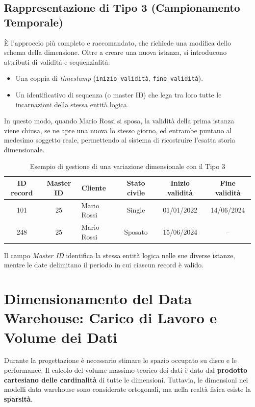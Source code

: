 \subsection{Rappresentazione di Tipo 3 (Campionamento Temporale)}
È l'approccio più completo e raccomandato, che richiede una modifica dello schema della dimensione. Oltre a creare una nuova istanza, si introducono attributi di validità e sequenzialità:
\begin{itemize}
    \item Una coppia di \textit{timestamp} (\texttt{inizio\_validità}, \texttt{fine\_validità}).
    \item Un identificativo di sequenza (o master ID) che lega tra loro tutte le incarnazioni della stessa entità logica.
\end{itemize}
In questo modo, quando Mario Rossi si sposa, la validità della prima istanza viene chiusa, se ne apre una nuova lo stesso giorno, ed entrambe puntano al medesimo soggetto reale, permettendo al sistema di ricostruire l'esatta storia dimensionale.

\begin{table}[htbp]
    \centering
    \caption{Esempio di gestione di una variazione dimensionale con il Tipo 3}
    \label{tab:scd-tipo3}
    \begin{tabular}{|c|c|l|c|c|c|}
        \hline
        \textbf{ID record} & \textbf{Master ID} & \textbf{Cliente} & \textbf{Stato civile} & \textbf{Inizio validità} & \textbf{Fine validità} \\
        \hline
        101 & 25 & Mario Rossi & Single & 01/01/2022 & 14/06/2024 \\
        \hline
        248 & 25 & Mario Rossi & Sposato & 15/06/2024 & -- \\
        \hline
    \end{tabular}
\end{table}

Il campo \textit{Master ID} identifica la stessa entità logica nelle sue diverse
istanze, mentre le date delimitano il periodo in cui ciascun record è valido.


\section{Dimensionamento del Data Warehouse: Carico di Lavoro e Volume dei Dati}

Durante la progettazione è necessario stimare lo spazio occupato su disco e le performance. Il calcolo del volume massimo teorico dei dati è dato dal \textbf{prodotto cartesiano delle cardinalità} di tutte le dimensioni. 
Tuttavia, le dimensioni nei modelli data warehouse sono considerate ortogonali, ma nella realtà fisica esiste la \textbf{sparsità}.

